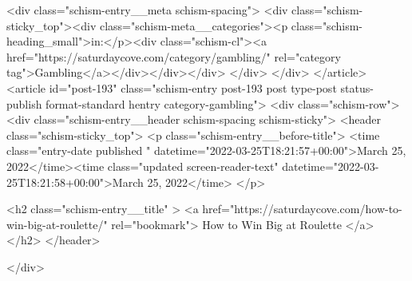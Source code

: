 {		<div class="schism-entry__meta schism-spacing">			<div class="schism-sticky_top"><div class="schism-meta__categories"><p class="schism-heading_small">in:</p><div class="schism-cl"><a href="https://saturdaycove.com/category/gambling/" rel="category tag">Gambling</a></div></div></div>		</div>
	</div>
</article>
<article id="post-193" class="schism-entry post-193 post type-post status-publish format-standard hentry category-gambling">
	<div class="schism-row">		<div class="schism-entry__header schism-spacing schism-sticky">			<header class="schism-sticky_top">				<p class="schism-entry__before-title">
					<time class="entry-date published " datetime="2022-03-25T18:21:57+00:00">March 25, 2022</time><time class="updated screen-reader-text" datetime="2022-03-25T18:21:58+00:00">March 25, 2022</time>				</p>

				<h2 class="schism-entry__title" >
					<a href="https://saturdaycove.com/how-to-win-big-at-roulette/" rel="bookmark">
						How to Win Big at Roulette					</a>
				</h2>
			</header>

					</div>

}
